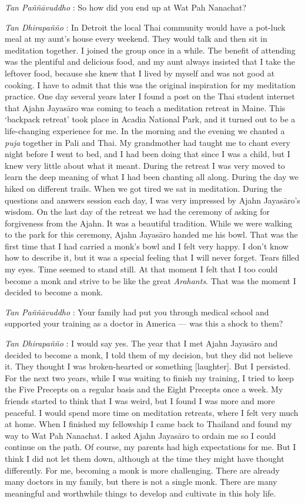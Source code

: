 \emph{Tan Paññāvuddho} : So how did you end up at Wat Pah Nanachat?

\emph{Tan Dhirapañño} : In Detroit the local Thai community would have a
pot-luck meal at my aunt's house every weekend. They would talk and then
sit in meditation together. I joined the group once in a while. The
benefit of attending was the plentiful and delicious food, and my aunt
always insisted that I take the leftover food, because she knew that I
lived by myself and was not good at cooking. I have to admit that this
was the original inspiration for my meditation practice. One day several
years later I found a post on the Thai student internet that Ajahn
Jayasāro was coming to teach a meditation retreat in Maine. This
`backpack retreat' took place in Acadia National Park, and it turned out
to be a life-changing experience for me. In the morning and the evening
we chanted a \emph{puja} together in Pali and Thai. My grandmother had
taught me to chant every night before I went to bed, and I had been
doing that since I was a child, but I knew very little about what it
meant. During the retreat I was very moved to learn the deep meaning of
what I had been chanting all along. During the day we hiked on different
trails. When we got tired we sat in meditation. During the questions and
answers session each day, I was very impressed by Ajahn Jayasāro's
wisdom. On the last day of the retreat we had the ceremony of asking for
forgiveness from the Ajahn. It was a beautiful tradition. While we were
walking to the park for this ceremony, Ajahn Jayasāro handed me his
bowl. That was the first time that I had carried a monk's bowl and I
felt very happy. I don't know how to describe it, but it was a special
feeling that I will never forget. Tears filled my eyes. Time seemed to
stand still. At that moment I felt that I too could become a monk and
strive to be like the great \emph{Arahants}. That was the moment I
decided to become a monk.

\emph{Tan Paññāvuddho} : Your family had put you through medical school
and supported your training as a doctor in America --- was this a shock
to them?

\emph{Tan Dhirapañño} : I would say yes. The year that I met Ajahn
Jayasāro and decided to become a monk, I told them of my decision, but
they did not believe it. They thought I was broken-hearted or something
{[}laughter{]}. But I persisted. For the next two years, while I was
waiting to finish my training, I tried to keep the Five Precepts on a
regular basis and the Eight Precepts once a week. My friends started to
think that I was weird, but I found I was more and more peaceful. I
would spend more time on meditation retreats, where I felt very much at
home. When I finished my fellowship I came back to Thailand and found my
way to Wat Pah Nanachat. I asked Ajahn Jayasāro to ordain me so I could
continue on the path. Of course, my parents had high expectations for
me. But I think I did not let them down, although at the time they might
have thought differently. For me, becoming a monk is more challenging.
There are already many doctors in my family, but there is not a single
monk. There are many meaningful and worthwhile things to develop and
cultivate in this holy life.

